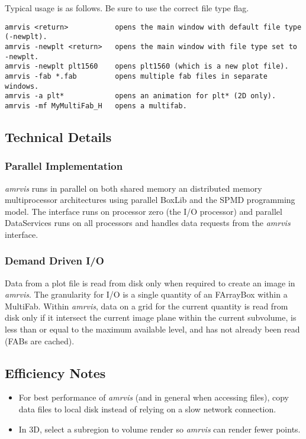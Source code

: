 \documentclass{article}
\begin{document}
Typical usage is as follows.  Be sure to use the correct file type flag.

\begin{verbatim}
amrvis <return>           opens the main window with default file type (-newplt).
amrvis -newplt <return>   opens the main window with file type set to -newplt.
amrvis -newplt plt1560    opens plt1560 (which is a new plot file).
amrvis -fab *.fab         opens multiple fab files in separate windows.
amrvis -a plt*            opens an animation for plt* (2D only).
amrvis -mf MyMultiFab_H   opens a multifab.
\end{verbatim}



\subsection{Technical Details}

\subsubsection{Parallel Implementation}

{\em amrvis} runs in parallel on both shared memory an distributed
memory multiprocessor architectures using parallel BoxLib and the
SPMD programming model.  The interface runs on processor zero
(the I/O processor) and parallel DataServices runs on all processors
and handles data requests from the {\em amrvis} interface.



\subsubsection{Demand Driven I/O}

Data from a plot file is read from disk only when required to create
an image in {\em amrvis}.  The granularity for I/O is a single quantity
of an FArrayBox within a MultiFab.  Within {\em amrvis}, data on a grid for the
current quantity is read from disk only if it intersect the current
image plane within the current subvolume, is less than or equal to the
maximum available level, and has not already been read (FABs are cached).


\subsection{Efficiency Notes}

\begin{itemize}
\item For best performance of {\em amrvis} (and in general when
accessing files), copy data files to local disk instead
of relying on a slow network connection.

\item In 3D, select a subregion to volume render so
{\em amrvis} can render fewer points.

\end{itemize}
\end{document}
